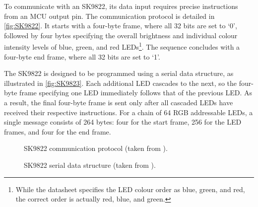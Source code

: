 \documentclass[12pt]{article}
\numberwithin{subsubsubsection}{subsubsection}
\begin{document}
To communicate with an SK9822, its data input requires precise instructions from an MCU output pin. The communication protocol is detailed in \autoref{fig:SK9822}. It starts with a four-byte frame, where all 32 bits are set to `0', followed by four bytes specifying the overall brightness and individual colour intensity levels of blue, green, and red LEDs\footnote{While the datasheet specifies the LED colour order as blue, green, and red, the correct order is actually red, blue, and green.}. The sequence concludes with a four-byte end frame, where all 32 bits are set to `1'. 

The SK9822 is designed to be programmed using a serial data structure, as illustrated in \autoref{fig:SK9823}. Each additional LED cascades to the next, so the four-byte frame specifying one LED immediately follows that of the previous LED. As a result, the final four-byte frame is sent only after all cascaded LEDs have received their respective instructions. For a chain of 64 RGB addressable LEDs, a single message consists of 264 bytes: four for the start frame, 256 for the LED frames, and four for the end frame.

\begin{figure}[H]
    \centering
    \caption{SK9822 communication protocol (taken from \cite{SK9824}).}
    \label{fig:SK9822}
\end{figure}

\begin{figure}[H]
    \centering
    \caption{SK9822 serial data structure (taken from \cite{SK9824}).}
    \label{fig:SK9823}
\end{figure}
\end{document}

